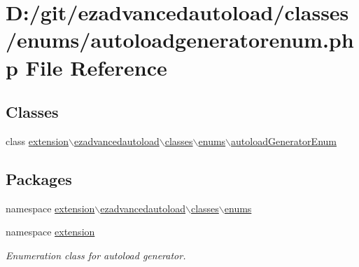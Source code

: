 \hypertarget{autoloadgeneratorenum_8php}{\section{\-D\-:/git/ezadvancedautoload/classes/enums/autoloadgeneratorenum.php \-File \-Reference}
\label{autoloadgeneratorenum_8php}
}
\subsection*{\-Classes}
\begin{DoxyCompactItemize}
\item 
class \hyperlink{classextension_1_1ezadvancedautoload_1_1classes_1_1enums_1_1autoload_generator_enum}{extension$\backslash$ezadvancedautoload$\backslash$classes$\backslash$enums$\backslash$autoload\-Generator\-Enum}
\end{DoxyCompactItemize}
\subsection*{\-Packages}
\begin{DoxyCompactItemize}
\item 
namespace \hyperlink{namespaceextension_1_1ezadvancedautoload_1_1classes_1_1enums}{extension$\backslash$ezadvancedautoload$\backslash$classes$\backslash$enums}
\item 
namespace \hyperlink{namespaceextension}{extension}
\begin{DoxyCompactList}\small\item\em \-Enumeration class for autoload generator. \end{DoxyCompactList}\end{DoxyCompactItemize}
